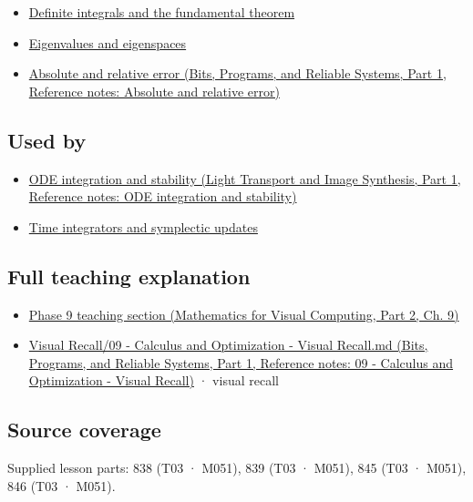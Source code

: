\begin{itemize}
\tightlist
\item
  \hyperref[appendix-1a50e72435c2]{Definite integrals and the fundamental theorem}
\item
  \hyperref[appendix-0b3be18411f9]{Eigenvalues and eigenspaces}
\item
  \href{../01-Bits-Programs-and-Reliable-Systems-P01/main.pdf\#appendix-3ae74e89b4e6}{Absolute and relative error (Bits, Programs, and Reliable Systems, Part 1, Reference notes: Absolute and relative error)}
\end{itemize}

\subsection{Used by}\label{appendix-e8ab9836882e-used-by}

\hypertarget{appendix-e8ab9836882e-used-by}{}

\begin{itemize}
\tightlist
\item
  \href{../04-Light-Transport-and-Image-Synthesis-P01/main.pdf\#appendix-18eacf61a04b}{ODE integration and stability (Light Transport and Image Synthesis, Part 1, Reference notes: ODE integration and stability)}
\item
  \hyperref[appendix-8f96f9c4d5bc]{Time integrators and symplectic updates}
\end{itemize}

\subsection{Full teaching explanation}\label{appendix-e8ab9836882e-full-teaching-explanation}

\hypertarget{appendix-e8ab9836882e-full-teaching-explanation}{}

\begin{itemize}
\tightlist
\item
  \href{../02-Mathematics-for-Visual-Computing-P02/main.pdf\#02-foundations-ii-ch025-odes-and-numerical-simulation}{Phase 9 teaching section (Mathematics for Visual Computing, Part 2, Ch. 9)}
\item
  \href{../01-Bits-Programs-and-Reliable-Systems-P01/main.pdf\#appendix-adf48f5dc5c1}{Visual Recall/09 - Calculus and Optimization - Visual Recall.md (Bits, Programs, and Reliable Systems, Part 1, Reference notes: 09 - Calculus and Optimization - Visual Recall)} · visual recall
\end{itemize}

\subsection{Source coverage}\label{appendix-e8ab9836882e-source-coverage}

\hypertarget{appendix-e8ab9836882e-source-coverage}{}

Supplied lesson parts: 838 (T03 · M051), 839 (T03 · M051), 845 (T03 · M051), 846 (T03 · M051).
